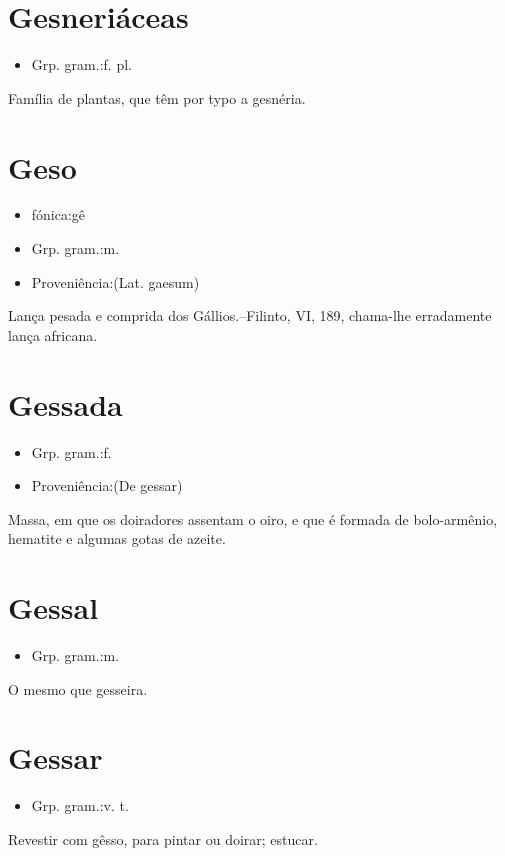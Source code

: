 \section{Gesneriáceas}
\begin{itemize}
\item {Grp. gram.:f. pl.}
\end{itemize}
Família de plantas, que têm por typo a gesnéria.
\section{Geso}
\begin{itemize}
\item {fónica:gê}
\end{itemize}
\begin{itemize}
\item {Grp. gram.:m.}
\end{itemize}
\begin{itemize}
\item {Proveniência:(Lat. \textunderscore gaesum\textunderscore )}
\end{itemize}
Lança pesada e comprida dos Gállios.--Filinto, VI, 189, chama-lhe erradamente lança africana.
\section{Gessada}
\begin{itemize}
\item {Grp. gram.:f.}
\end{itemize}
\begin{itemize}
\item {Proveniência:(De \textunderscore gessar\textunderscore )}
\end{itemize}
Massa, em que os doiradores assentam o oiro, e que é formada de bolo-armênio, hematite e algumas gotas de azeite.
\section{Gessal}
\begin{itemize}
\item {Grp. gram.:m.}
\end{itemize}
O mesmo que \textunderscore gesseira\textunderscore .
\section{Gessar}
\begin{itemize}
\item {Grp. gram.:v. t.}
\end{itemize}
Revestir com gêsso, para pintar ou doirar; estucar.
